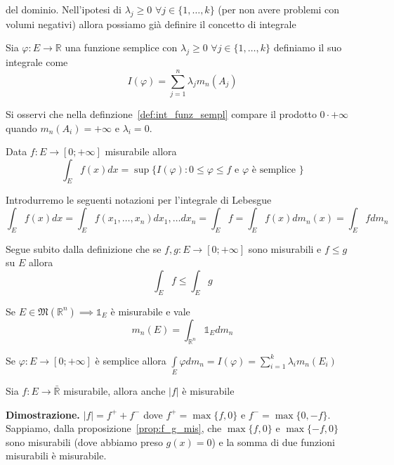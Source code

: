 del dominio. Nell'ipotesi di $\lambda_j \geq 0 \, \, \forall j \in \{1, \ldots, k \}$ (per non avere problemi con volumi negativi) allora possiamo già definire il concetto di integrale
%
\vspace{0.5cm}
\begin{definition}
	Sia $\varphi: E \to \mathbb{R}$ una funzione semplice con $\lambda_j \geq 0 \, \, \forall j \in \{1, \ldots, k \}$ definiamo il suo integrale come
	\begin{equation}
		I(\varphi) = \sum_{j=1}^n \lambda_j m_n(A_j)
		\label{def:int_funz_sempl}
	\end{equation}
\end{definition}
\begin{remark}
Si osservi che nella definzione~\ref{def:int_funz_sempl} compare il prodotto $0 \cdot +\infty$ quando $m_n(A_i) = +\infty$ e $\lambda_i = 0$.
\end{remark}
%
\vspace{0.5cm}
\begin{definition}[\textcolor{blue}{integrale di Lebesgue}]
	Data $f: E \to [0; +\infty]$ misurabile allora
	$$
		\int_E f(x)dx = \sup\{I(\varphi) : 0 \leq \varphi \leq f \text{ e } \varphi \text{ è semplice } \}
	$$
\end{definition}
%
Introdurremo le seguenti notazioni per l'integrale di Lebesgue
$$
\int_E f(x)dx = \int_E f(x_1, \ldots, x_n)dx_1, \ldots dx_n = \int_E f = \int_E f(x)dm_n(x) = \int_E fdm_n 
$$
%
\begin{remark}
Segue subito dalla definizione che se $f, g: E \to [0; +\infty]$ sono misurabili e $f \leq g$ su $E$ allora
$$
\int_E f \leq \int_E g
$$
\end{remark}
%
\begin{remark}
Se $E \in \mathfrak{M}(\mathbb{R}^n) \implies \mathbb{1}_E$ è misurabile e vale
$$
m_n(E) = \int_{\mathbb{R}^n} \mathbb{1}_E dm_n
$$
\end{remark}
%
\begin{remark}
Se $\varphi: E \to [0; +\infty]$ è semplice allora $\int\limits_E \varphi dm_n = I(\varphi) = \sum\limits_{i=1}^k \lambda_i m_n(E_i) $
\end{remark}
%
\vspace{0.5cm}
\begin{prop}
Sia $f: E \to \bar{\mathbb{R}}$ misurabile, allora anche $|f|$ è misurabile
\end{prop}
%
\noindent \textbf{Dimostrazione. }
$|f| = f^+ + f^-$ dove $f^{+} = \max\{f, 0 \}$ e $f^{-}=\max\{0, -f \}$. Sappiamo, dalla proposizione~\ref{prop:f_g_mis}, che $\max\{f,0 \}$ e $\max\{-f, 0\}$ sono misurabili (dove abbiamo preso $g(x) = 0$) e la somma di due funzioni misurabili è misurabile.
